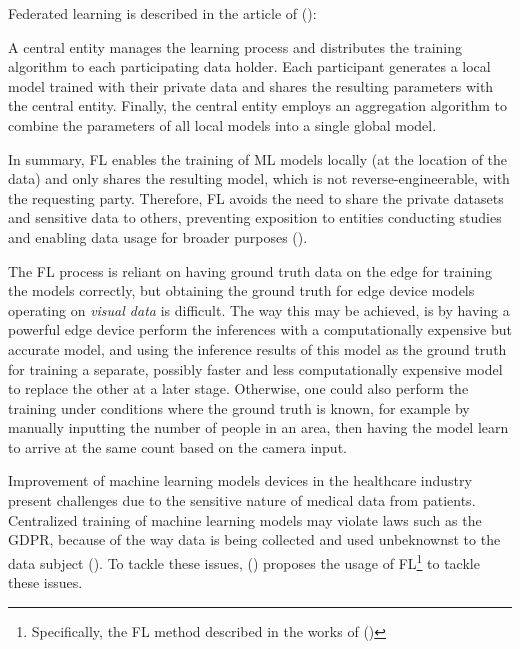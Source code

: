 \newpage Federated learning is described in the article of \citeauthor{an2022federatedlearninghealthcare} (\citeyear{an2022federatedlearninghealthcare}): 

\begin{myquote}
    A central entity manages the learning process and distributes the training algorithm to each participating data holder. Each participant generates a local model trained with their private data and shares the resulting parameters with the central entity. Finally, the central entity employs an aggregation algorithm to combine the parameters of all local models into a single global model.
\end{myquote}

In summary, FL enables the training of ML models locally (at the location of the data) and only shares the resulting model, which is not reverse-engineerable, with the requesting party. Therefore, FL avoids the need to share the private datasets and sensitive data to others, preventing exposition to entities conducting studies and enabling data usage for broader purposes (\cite{re2021servertoclientml}). 

The FL process is reliant on having ground truth data on the edge for training the models correctly, but obtaining the ground truth for edge device models operating on \textit{visual data} is difficult. The way this may be achieved, is by having a powerful edge device perform the inferences with a computationally expensive but accurate model, and using the inference results of this model as the ground truth for training a separate, possibly faster and less computationally expensive model to replace the other at a later stage. Otherwise, one could also perform the training under conditions where the ground truth is known, for example by manually inputting the number of people in an area, then having the model learn to arrive at the same count based on the camera input.

Improvement of machine learning models devices in the healthcare industry present challenges due to the sensitive nature of medical data from patients. Centralized training of machine learning models may violate laws such as the GDPR, because of the way data is being collected and used unbeknownst to the data subject (\cite{an2022federatedlearninghealthcare}). To tackle these issues, \citeauthor{an2022federatedlearninghealthcare} (\citeyear{an2022federatedlearninghealthcare}) proposes the usage of FL\footnote{Specifically, the FL method described in the works of \citeauthor{ya2019federatedMLconcepts}(\citeyear{ya2019federatedMLconcepts})} to tackle these issues.

